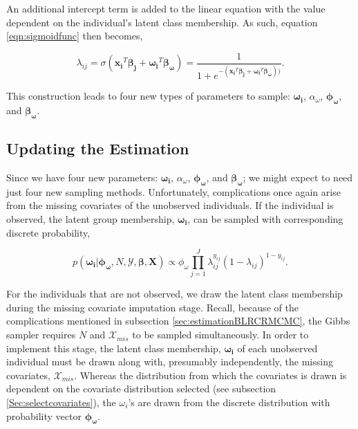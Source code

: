 \documentclass[
  12pt,
]{article}
\begin{document}
An additional intercept term is added to the linear equation with the
value dependent on the individual's latent class membership. As such,
equation \ref{eqn:sigmoidfunc} then becomes,

\begin{equation}
\label{eqn:sigmoidfunclatentvariable}
\lambda_{ij}=\sigma(\boldsymbol{x_i}^T\boldsymbol{\beta_j} + \boldsymbol{\omega_i}^T\boldsymbol{\beta_\omega}) = \frac{1}{1+e^{-(\boldsymbol{x_i}^T\boldsymbol{\beta_j}+\boldsymbol{\omega_i}^T\boldsymbol{\beta_\omega}))}}.
\end{equation}

This construction leads to four new types of parameters to sample:
\(\boldsymbol{\omega_i}\), \(\alpha_\omega\),
\(\boldsymbol{\phi_\omega}\), and \(\boldsymbol{\beta_\omega}\).

\subsection{Updating the Estimation}

Since we have four new parameters: \(\boldsymbol{\omega_i}\),
\(\alpha_\omega\), \(\boldsymbol{\phi_\omega}\), and
\(\boldsymbol{\beta_\omega}\); we might expect to need just four new
sampling methods. Unfortunately, complications once again arise from the
missing covariates of the unobserved individuals. If the individual is
observed, the latent group membership, \(\boldsymbol{\omega_i}\), can be
sampled with corresponding discrete probability,

\begin{equation}
\label{eqn:latentvariableomega}
p(\boldsymbol{\omega_i}|\boldsymbol{\phi_\omega},N,\mathcal{Y},\boldsymbol{\beta},\boldsymbol{X}) \propto \phi_\omega\prod_{j=1}^J\lambda_{ij}^{y_{ij}}(1-\lambda_{ij})^{1-y_{ij}}.
\end{equation}

For the individuals that are not observed, we draw the latent class
membership during the missing covariate imputation stage. Recall,
because of the complications mentioned in subsection
\ref{sec:estimationBLRCRMCMC}, the Gibbs sampler requires \(N\) and
\(\mathcal{X}_{mis}\) to be sampled simultaneously. In order to
implement this stage, the latent class membership,
\(\boldsymbol{\omega_i}\) of each unobserved individual must be drawn
along with, presumably independently, the missing covariates,
\(\mathcal{X}_{mis}\). Whereas the distribution from which the
covariates is drawn is dependent on the covariate distribution selected
(see subsection \ref{Sec:selectcovariates}), the \(\omega_i\)'s are
drawn from the discrete distribution with probability vector
\(\boldsymbol{\phi_\omega}\).
\end{document}
